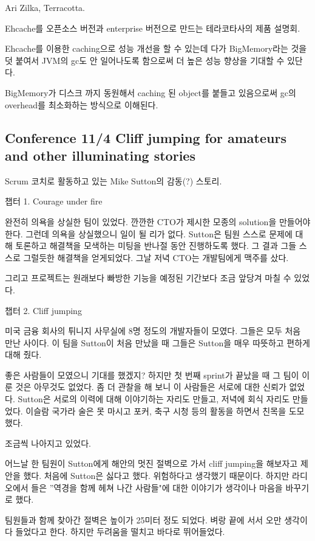 \documentclass[a4paper]{article}
\begin{document}
Ari Zilka, Terracotta.
 
Ehcache를 오픈소스 버전과 enterprise 버전으로 만드는 테라코타사의 제품 설명회.
 
Ehcache를 이용한 caching으로 성능 개선을 할 수 있는데 다가 BigMemory라는 것을 덧 붙여서 JVM의  gc도 안 일어나도록 함으로써 더 높은 성능 향상을 기대할 수 있단다.
 
BigMemory가 디스크 까지 동원해서 caching 된 object를 붙들고 있음으로써  gc의  overhead를 최소화하는 방식으로 이해된다.
 
\subsection{Conference 11/4 Cliff jumping for amateurs and other illuminating stories}
 
Scrum 코치로 활동하고 있는 Mike Sutton의 감동(?) 스토리.
 
챕터 1. Courage under fire
 
완전히 의욕을 상실한 팀이 있었다. 깐깐한 CTO가 제시한 모종의 solution을
만들어야 한다.  그런데 의욕을 상실했으니 일이 될 리가 없다. Sutton은
팀원 스스로 문제에 대해 토론하고 해결책을 모색하는 미팅을 반나절 동안
진행하도록 했다. 그 결과 그들 스스로 그럴듯한 해결책을 얻게되었다. 그날
저녁 CTO는 개발팀에게 맥주를 샀다.
 
그리고 프로젝트는 원래보다 빠방한 기능을 예정된 기간보다 조금 앞당겨 마칠 수 있었다.
 
챕터 2. Cliff jumping
 
미국 금융 회사의 튀니지 사무실에 8명 정도의 개발자들이 모였다. 그들은
모두 처음 만난 사이다.  이 팀을 Sutton이 처음 만났을 때 그들은 Sutton을
매우 따뜻하고 편하게 대해 줬다.
 
좋은 사람들이 모였으니 기대를 했겠지? 하지만 첫 번째 sprint가 끝났을 때
그 팀이 이룬 것은 아무것도 없었다. 좀 더 관찰을 해 보니 이 사람들은
서로에 대한 신뢰가 없었다. Sutton은 서로의 이력에 대해 이야기하는
자리도 만들고, 저녁에 회식 자리도 만들었다. 이슬람 국가라 술은 못
마시고 포커, 축구 시청 등의 활동을 하면서 친목을 도모했다.
 
조금씩 나아지고 있었다.
 
어느날 한 팀원이 Sutton에게 해안의 멋진 절벽으로 가서 cliff jumping을
해보자고 제안을 했다. 처음에 Sutton은 싫다고 했다. 위험하다고 생각했기
때문이다.  하지만 라디오에서 들은 ”역경을 함께 헤쳐 나간 사람들"에 대한
이야기가 생각이나 마음을 바꾸기로 했다.
 
팀원들과 함께 찾아간 절벽은 높이가 25미터 정도 되었다. 벼랑 끝에 서서
오만 생각이 다 들었다고 한다. 하지만 두려움을 떨치고 바다로
뛰어들었다.
 
\end{document}
